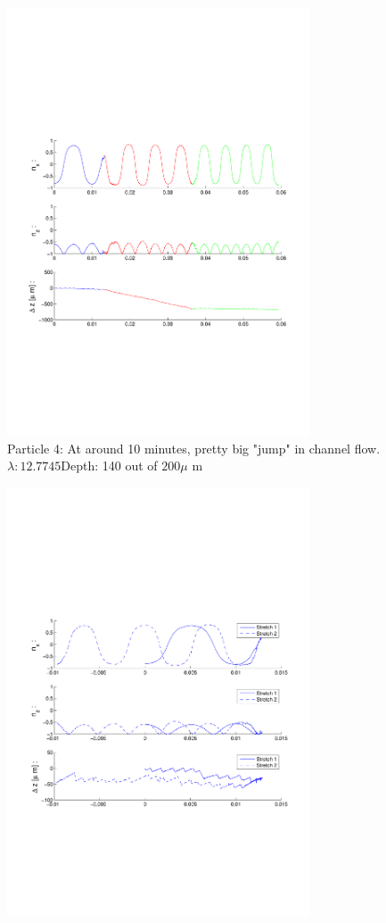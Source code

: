 \begin{figure}[H]
\centering
\includegraphics[width=0.8\textwidth]{Images/Particle 4/Particle4.pdf}
\caption{Particle 4: At around 10 minutes, pretty big "jump" in channel flow. $ \lambda: 12.7745$Depth: 140 out of $200 \mu $ m}
\end{figure}

\begin{figure}[H]
\centering
\includegraphics[width=0.8\textwidth]{Images/Particle 4/Stretch1.pdf}
\end{figure}


